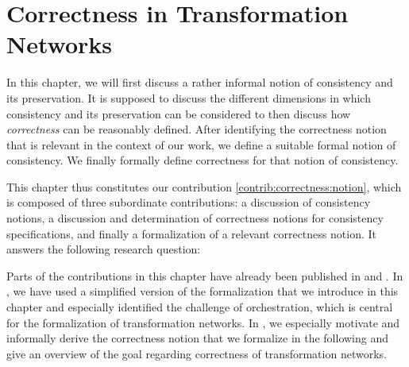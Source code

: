 \chapter{Correctness in Transformation Networks
}
\label{chap:correctness}



In this chapter, we will first discuss a rather informal notion of consistency and its preservation. It is supposed to discuss the different dimensions in which consistency and its preservation can be considered to then discuss how \emph{correctness} can be reasonably defined.
After identifying the correctness notion that is relevant in the context of our work, we define a suitable formal notion of consistency.
We finally formally define correctness for that notion of consistency.

This chapter thus constitutes our contribution \autoref{contrib:correctness:notion}, which is composed of three subordinate contributions: a discussion of consistency notions, a discussion and determination of correctness notions for consistency specifications, and finally a formalization of a relevant correctness notion.
It answers the following research question:


Parts of the contributions in this chapter have already been published in  and .
In , we have used a simplified version of the formalization that we introduce in this chapter and especially identified the challenge of orchestration, which is central for the formalization of transformation networks.
In , we especially motivate and informally derive the correctness notion that we formalize in the following and give an overview of the goal regarding correctness of transformation networks.







